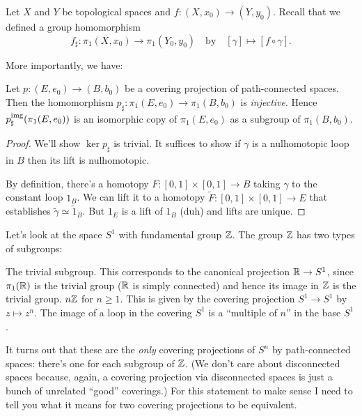 Let $X$ and $Y$ be topological spaces and $f : (X, x_0) \to (Y, y_0)$.
Recall that we defined a group homomorphism
\[ f_\sharp : \pi_1(X, x_0) \to \pi_1(Y_0, y_0) 
	\quad\text{by}\quad
	[\gamma] \mapsto [f \circ \gamma]. \]

More importantly, we have:
\begin{proposition}
	Let $p : (E,e_0) \to (B,b_0)$ be a covering projection of path-connected spaces.
	Then the homomorphism $p_\sharp : \pi_1(E, e_0) \to \pi_1(B, b_0)$ is \emph{injective}.
	Hence $p_\sharp ^{\text{img}}(\pi_1(E, e_0))$ is an isomorphic copy of $\pi_1(E, e_0)$ 
	as a subgroup of $\pi_1(B, b_0)$.
\end{proposition}
\begin{proof}
	We'll show $\ker p_\sharp$ is trivial.
	It suffices to show if $\gamma$ is a nulhomotopic loop in $B$ 
	then its lift is nulhomotopic.

	By definition, there's a homotopy $F : [0,1] \times [0,1] \to B$
	taking $\gamma$ to the constant loop $1_B$.
	We can lift it to a homotopy $\tilde F : [0,1] \times [0,1] \to E$
	that establishes $\tilde\gamma \simeq \tilde 1_B$.
	But $1_E$ is a lift of $1_B$ (duh) and lifts are unique.
\end{proof}

\begin{example}[Subgroups of $\ZZ$]
	Let's look at the space $S^1$ with fundamental group $\ZZ$.
	The group $\ZZ$ has two types of subgroups:
	\begin{itemize}
		\ii The trivial subgroup.
		This corresponds to the canonical projection $\mathbb R \to S^1$,
		since $\pi_1(\mathbb R)$ is the trivial group ($\mathbb R$ is simply connected)
		and hence its image in $\ZZ$ is the trivial group.
		\ii $n\mathbb Z$ for $n \ge 1$.
		This is given by the covering projection $S^1 \to S^1$
		by $z \mapsto z^n$.
		The image of a loop in the covering $S^1$ is a ``multiple of $n$''
		in the base $S^1$.
	\end{itemize}
\end{example}

It turns out that these are the \emph{only} covering projections of $S^n$ by path-connected spaces: there's one for each subgroup of $\ZZ$.
(We don't care about disconnected spaces because, again, a covering projection
via disconnected spaces is just a bunch of unrelated ``good'' coverings.)
For this statement to make sense I need to tell you what it means for
two covering projections to be equivalent.

